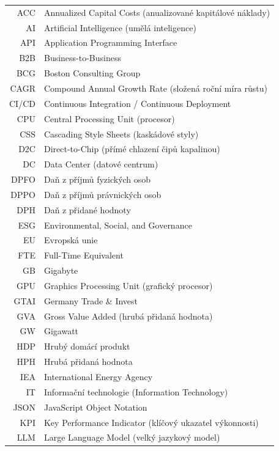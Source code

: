\documentclass[czech,bachelor,oneside]{ctufit-thesis}
\begin{document}
\begin{longtable}{rl}
    ACC     & Annualized Capital Costs (anualizované kapitálové náklady) \\
    AI      & Artificial Intelligence (umělá inteligence)  \\
    API     & Application Programming Interface \\
    B2B     & Business-to-Business \\
    BCG     & Boston Consulting Group \\
    CAGR    & Compound Annual Growth Rate (složená roční míra růstu) \\
    CI/CD   & Continuous Integration / Continuous Deployment \\
    CPU     & Central Processing Unit (procesor) \\
    CSS     & Cascading Style Sheets (kaskádové styly) \\
    D2C     & Direct-to-Chip (přímé chlazení čipů kapalinou) \\
    DC      & Data Center (datové centrum) \\
    DPFO    & Daň z příjmů fyzických osob \\
    DPPO    & Daň z příjmů právnických osob \\
    DPH     & Daň z přidané hodnoty \\
    ESG     & Environmental, Social, and Governance \\
    EU      & Evropská unie \\
    FTE     & Full-Time Equivalent \\
    GB      & Gigabyte \\
    GPU     & Graphics Processing Unit (grafický procesor) \\
    GTAI    & Germany Trade \& Invest \\
    GVA     & Gross Value Added (hrubá přidaná hodnota) \\
    GW      & Gigawatt \\
    HDP     & Hrubý domácí produkt \\
    HPH     & Hrubá přidaná hodnota \\
    IEA     & International Energy Agency \\
    IT      & Informační technologie (Information Technology) \\
    JSON    & JavaScript Object Notation \\
    KPI     & Key Performance Indicator (klíčový ukazatel výkonnosti) \\
    LLM     & Large Language Model (velký jazykový model) \\

\end{longtable}
\end{document}
